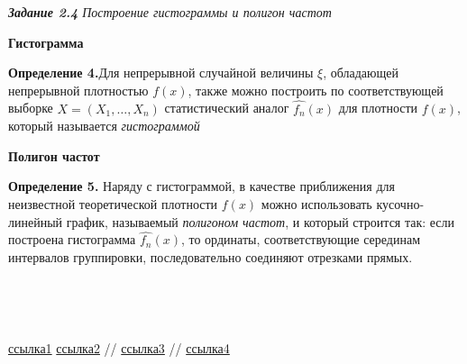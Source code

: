 \documentclass[a4paper,12pt, oneside]{book}
\begin{document}
\newpage
{\large\textit{\textbf{Задание 2.4} Построение гистограммы и полигон частот}}

\vspace{5mm}
\large{\textbf{Гистограмма}}
\vspace{5mm}

\normalsize{\textbf{Определение 4.}}Для непрерывной случайной величины $\xi$, обладающей непрерывной плотностью $f(x)$, также можно построить по соответствующей выборке $X = (X_1, \ldots, X_n)$ статистический аналог $\hat{f_n} (x)$ для плотности $f(x)$, который называется \textit{гистограммой}  

\vspace{5mm}
\large{\textbf{Полигон частот}}
\vspace{5mm}

\normalsize{\textbf{Определение 5.}} Наряду с гистограммой, в качестве приближения для неизвестной теоретической плотности $ f(x)$ можно использовать кусочно-линейный график, называемый \textit{полигоном частот}, и который строится так: если построена гистограмма $\hat{f_n} (x)$, то ординаты, соответствующие серединам интервалов группировки, последовательно соединяют отрезками прямых. 


\vspace{5mm}
\\
\vspace{5mm}


\vspace{5mm}
\\
\vspace{5mm}





\begin{thebibliography}{99}
	 \href{https://towardsdatascience.com/what-is-exponential-distribution-7bdd08590e2a}{ссылка1}
	  \href{https://www.statisticshowto.datasciencecentral.com/exponential-distribution/}{ссылка2}
	  // \href{http://www.ams.jhu.edu/~dan/550.435/notes/COURSENOTES435.pdf}{ссылка3}
	  // \href{http://www.obzh.ru/nad/4-3.html}{ссылка4}
\end{thebibliography}
\end{document}
